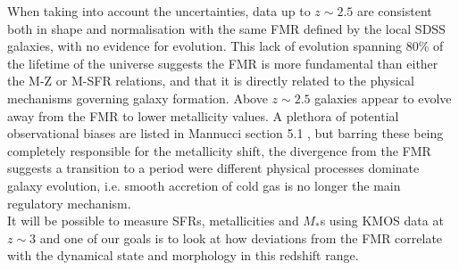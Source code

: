 \documentclass{literature}
\begin{document}
When taking into account the uncertainties, data up to $z \sim 2.5$ are consistent both in shape and normalisation with the same FMR defined by the local SDSS galaxies, with no evidence for evolution. This lack of evolution spanning 80\% of the lifetime of the universe suggests the FMR is more fundamental than either the M-Z or M-SFR relations, and that it is directly related to the physical mechanisms governing galaxy formation. Above $z \sim 2.5$ galaxies appear to evolve away from the FMR to lower metallicity values. A plethora of potential observational biases are listed in Mannucci section 5.1 \citep{Mannucci2010}, but barring these being completely responsible for the metallicity shift, the divergence from the FMR suggests a transition to a period were different physical processes dominate galaxy evolution, i.e. smooth accretion of cold gas is no longer the main regulatory mechanism. \\ 
It will be possible to measure SFRs, metallicities and $M_{*}$s using KMOS data at $z \sim 3$ and one of our goals is to look at how deviations from the FMR correlate with the dynamical state and morphology in this redshift range.   
\end{document}
